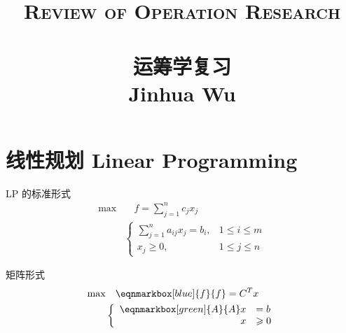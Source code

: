 
\usepackage{ulem}
\usepackage{pdfpages}
\usepackage{soul}
\usepackage{etoolbox}
\usepackage{graphicx}
\usepackage{multicol}
\usepackage{multirow}
\usepackage{enumitem}
\usepackage{zhlipsum}
\usepackage{bbm}
\usepackage{diagbox}
\usepackage{enumerate}
\usepackage{cleveref}
\usepackage{annotate-equations}
\usepackage{zhlipsum}
\usetikzlibrary{positioning}



\newcommand*\circled[1]{\tikz[baseline=(char.base)]{
		\node[shape=circle,draw,inner sep=2pt] (char) {#1};}}

\linespread{1.5}
\title{ \normalsize \textsc{Review of Operation Research}
	\\ [2.0cm]
	\HRule{1.5pt} \\
	\LARGE \textbf{\uppercase{运筹学复习}
		\HRule{2.0pt} \\ [0.6cm] \LARGE{Jinhua Wu} \vspace*{10\baselineskip}}
}
\date{}
\author{}


	\maketitle
	\tableofcontents 
	\newpage
	\setcounter{page}{1}
	\chapter{线性规划 Linear Programming}
	LP 的标准形式
	\begin{align*}
		\max &\quad f = \sum\limits_{j=1}^n c_jx_j \\
            & \left\lbrace\begin{array}{ll}
                \sum\limits_{j=1}^n a_{ij}x_j = b_i, & 1\leqslant i\leqslant m  \\
                x_j \geqslant 0, & 1\leqslant j\leqslant n
            \end{array} \right.
	\end{align*}
	
	矩阵形式
 \begin{align*}
		\max &\quad \eqnmarkbox[blue]{f}{f} = C^T x \\
            & \left\lbrace\begin{array}{rl}
                \eqnmarkbox[green]{A}{A}x &= b  \\
                x &\geqslant 0
            \end{array} \right.
	\end{align*}
	
	
